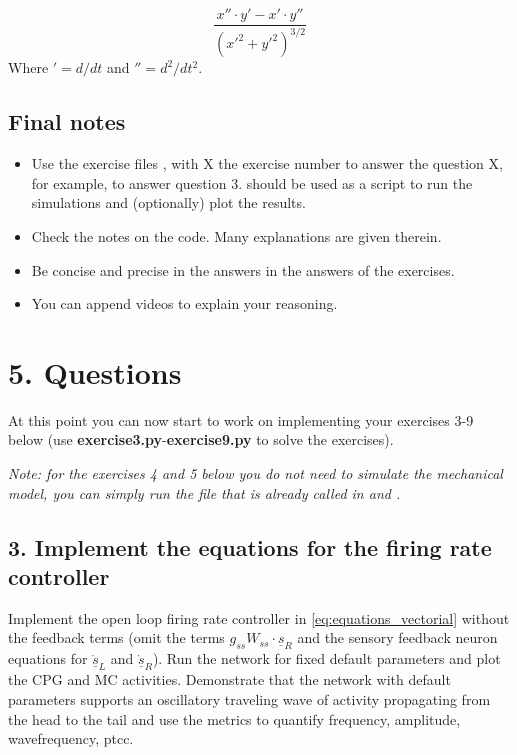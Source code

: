 \documentclass{cmc}
\begin{document}
\begin{equation}
 \label{eq:curvature}
 \frac{x'' \cdot y' - x' \cdot y''}{(x'^2 + y'^2)^{3/2}}
\end{equation}
Where $'=d/dt$ and $''=d^2/dt^2$.



\subsection*{Final notes}
\begin{itemize}
\item Use the exercise files , with X the exercise number to answer the question X, for example,  to answer question 3.  should be used as a script to run the simulations and (optionally) plot the results.
\item Check the notes on the code. Many explanations are given therein.
\item Be concise and precise in the answers in the answers of the exercises.
\item You can append videos to explain your reasoning.
\end{itemize}



\newpage
\section*{5. Questions}
At this point you can now start to work on implementing your exercises 3-9 below (use \textbf{exercise3.py}-\textbf{exercise9.py} to solve the exercises).

\textit{Note: for the exercises 4 and 5 below you do not need to simulate the mechanical model, you can simply run the  file that is already called in  and . }

\subsection*{3. Implement the equations for the firing rate controller}\label{sec:ex3}
Implement the open loop firing rate controller in \ref{eq:equations_vectorial} without the feedback terms (omit the terms $g_{ss} W_{ss} \cdot \underline{s}_R$ and the sensory feedback neuron equations for $\dot{\underline{s}}_L$ and $\dot{\underline{s}}_R$). Run the network for fixed default parameters and plot the CPG and MC activities. Demonstrate that the network with default parameters supports an oscillatory traveling wave of activity propagating from the head to the tail and use the metrics to quantify frequency, amplitude, wavefrequency, ptcc.
\end{document}
